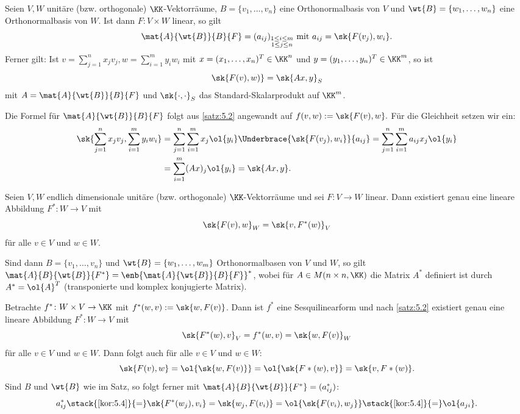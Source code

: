 \begin{korollar}
	\label{kor:5.4}
	Seien $V,W$ unitäre (bzw. orthogonale) $\KK$-Vektorräume, $B = \{v_1,\dots,v_n\}$ eine Orthonormalbasis von $V$ und $\wt{B} = \{w_1,\dots,w_n\}$ eine Orthonormalbasis von $W$.
	Ist dann $F \colon V \times W$ linear, so gilt
	\[
		\mat{A}{\wt{B}}{B}{F} = (a_{ij})_{\substack{1 \leq i \leq m \\ 1 \leq j \leq n}} \text{ mit } a_{ij} = \sk{F(v_j),w_i}.
	\]
	Ferner gilt:
	Ist $v = \sum_{j=1}^{n} x_j v_j, w = \sum_{i=1}^{m} y_i w_i$ mit $x = (x_1,\dots,x_n)^T \in \KK^n$ und $y = (y_1,\dots,y_n)^T \in \KK^m$, so ist
	\[
		\sk{F(v),w)} = \sk{Ax,y}_S
	\]
	mit $A = \mat{A}{\wt{B}}{B}{F}$ und $\sk{\cdot,\cdot}_S$ das Standard-Skalarprodukt auf $\KK^m$.
\end{korollar}
\newpage
\begin{beweis}
	Die Formel für $\mat{A}{\wt{B}}{B}{F}$ folgt aus \autoref{satz:5.2} angewandt auf $f(v,w) := \sk{F(v),w}.$
	Für die Gleichheit setzen wir ein:
	\begin{align*}
		\sk{\sum_{j=1}^{n} x_j v_j, \sum_{i=1}^{m} y_i w_i} &= \sum_{j=1}^{n} \sum_{i=1}^{m} x_j \ol{y_i} \Underbrace{\sk{F(v_j),w_i}}{a_{ij}} = \sum_{j=1}^{n} \sum_{i=1}^{m} a_{ij} x_j \ol{y_i} \\
		&= \sum_{i=1}^{m} (Ax)_j \ol{y_i} = \sk{Ax,y}. 
	\end{align*}
\end{beweis}

\begin{satz}
	\label{satz:5.5}
	Seien $V,W$ endlich dimensionale unitäre (bzw. orthogonale) $\KK$-Vektorräume und sei $F \colon V \rightarrow W$ linear.
	Dann existiert genau eine lineare Abbildung $F^* \colon W \rightarrow V$ mit
	\[
		\sk{F(v),w}_W = \sk{v,F^*(w)}_V
	\]
	für alle $v \in V$ und $w \in W$.
	
	Sind dann $B = \{v_1,\dots,v_n\}$ und $\wt{B} = \{w_1,\dots,w_m\}$ Orthonormalbasen von $V$ und $W$, so gilt $\mat{A}{B}{\wt{B}}{F^*} = \enb{\mat{A}{\wt{B}}{B}{F}}^*$, wobei für $A \in M(n \times n, \KK)$ die Matrix $A^*$ definiert ist durch $A^* = \ol{A}^T$ (transponierte und komplex konjugierte Matrix).
\end{satz}

\begin{beweis}
	Betrachte $f^*\colon W \times V \rightarrow \KK$ mit $f^*(w,v) := \sk{w,F(v)}$.
	Dann ist $f^*$ eine Sesquilinearform und nach \autoref{satz:5.2} existiert genau eine lineare Abbildung $F^*\colon W \rightarrow V$ mit
	\[
		\sk{F^*(w),v}_V = f^*(w,v) = \sk{w,F(v)}_W
	\]
	für alle $v \in V$ und $w \in W$.
	Dann folgt auch für alle $v \in V$ und $w \in W$:
	\[
		\sk{F(v),w} = \ol{\sk{w,F(v)}} = \ol{\sk{F*(w),v}} = \sk{v,F*(w)}.
	\]
	Sind $B$ und $\wt{B}$ wie im Satz, so folgt ferner mit $\mat{A}{B}{\wt{B}}{F^*} = (a^*_{ij})$:
	\[
		a^*_{ij} \stack{\ref{kor:5.4}}{=} \sk{F^*(w_j),v_i} = \sk{w_j,F(v_i)} = \ol{\sk{F(v_i),w_j}} \stack{\ref{kor:5.4}}{=} \ol{a_{ji}}. 
	\]
\end{beweis}

